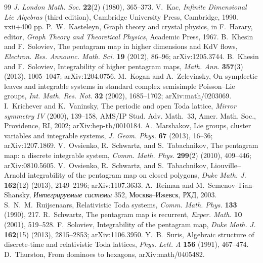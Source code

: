\begin{thebibliography}{99}
\emph{J. London Math. Soc.} \textbf{22}(2) (1980), 365--373.
 V.~Kac, \emph{Infinite Dimensional Lie Algebras} (third edition), Cambridge
University Press, Cambridge, 1990. xxii+400 pp.
 P.~W.~Kasteleyn, Graph theory and crystal physics, in F.~Harary,
editor, \emph{Graph Theory and Theoretical Physics}, Academic Press, 1967.
 B.~Khesin and F.~Soloviev, The pentagram map in higher dimensions and
KdV flows, \emph{Electron. Res. Announc. Math. Sci.} \textbf{19} (2012), 86--96;
arXiv:1205.3744.
 B.~Khesin and F.~Soloviev, Integrability of higher pentagram maps,
\emph{Math. Ann.} \textbf{357}(3) (2013), 1005--1047; arXiv:1204.0756.
 M.~Kogan and A.~Zelevinsky, On symplectic leaves and integrable systems in
standard complex semisimple Poisson--Lie groups, \emph{Int. Math. Res. Not.} \textbf{32}
(2002), 1685--1702; arXiv:math/0203069.
 I.~Krichever and K.~Vaninsky, The periodic and open Toda lattice,
\emph{Mirror symmetry IV} (2000), 139--158, AMS/IP Stud. Adv. Math.~33, Amer. Math.
Soc., Providence, RI, 2002; arXiv:hep-th/0010184.
 A.~Marshakov, Lie groups, cluster variables and integrable systems,
\emph{J. Geom. Phys.} \textbf{67} (2013), 16--36; arXiv:1207.1869.
 V.~Ovsienko, R.~Schwartz, and S.~Tabachnikov, The pentagram map: a
discrete integrable system, \emph{Comm. Math. Phys.} \textbf{299}(2) (2010), 409--446;
arXiv:0810.5605.
 V.~Ovsienko, R.~Schwartz, and S.~Tabachnikov, Liouville--Arnold
integrability of the pentagram map on closed polygons, \emph{Duke Math. J.}
\textbf{162}(12) (2013), 2149--2196; arXiv:1107.3633.
 A.~Reiman and M.~Semenov-Tian-Shansky, {\itshape Интегрируемые системы} 352,
{Москва--Ижевск, РХД, 2003}.
 S.~N.~M.~Ruijsenaars, Relativistic Toda systems,
\emph{Comm. Math. Phys.} \textbf{133} (1990), 217.
 R.~Schwartz, The pentagram map is recurrent, \emph{Exper. Math.}
\textbf{10} (2001), 519--528.
 F.~Soloviev, Integrability of the pentagram map, \emph{Duke Math. J.}
\textbf{162}(15) (2013), 2815--2853; arXiv:1106.3950.
 Y.~B.~Suris, Algebraic structure of discrete-time and relativistic Toda
lattices, \emph{Phys. Lett. A} \textbf{156} (1991), 467--474.
 D.~Thurston, From dominoes to hexagons, arXiv:math/0405482.
\end{thebibliography}
